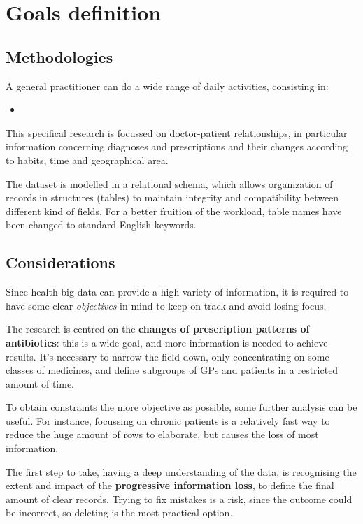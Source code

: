 \chapter{Goals definition} %
\section{Methodologies}
A general practitioner can do a wide range of daily activities, consisting in:
\begin{itemize}
	\item 
\end{itemize}
This specifical research is focussed on doctor-patient relationships, in particular information concerning diagnoses and prescriptions and their changes according to habits, time and geographical area. 

The dataset is modelled in a relational schema, which allows organization of records in structures (tables) to maintain integrity and compatibility between different kind of fields. For a better fruition of the workload, table names have been changed to standard English keywords.





\section{Considerations}
Since health big data can provide a high variety of information, it is required to have some clear \textit{objectives} in mind to keep on track and avoid losing focus. 

The research is centred on the \textbf{changes of prescription patterns of antibiotics}: this is a wide goal, and more information is needed to achieve results. It's necessary to narrow the field down, only concentrating on some classes of medicines, and define subgroups of GPs and patients in a restricted amount of time.

To obtain constraints the more objective as possible, some further analysis can be useful. For instance, focussing on chronic patients is a relatively fast way to reduce the huge amount of rows to elaborate, but causes the loss of most information.

The first step to take, having a deep understanding of the data, is recognising the extent and impact of the \textbf{progressive information loss}, to define the final amount of clear records. Trying to fix mistakes is a risk, since the outcome could be incorrect, so deleting is the most practical option.

